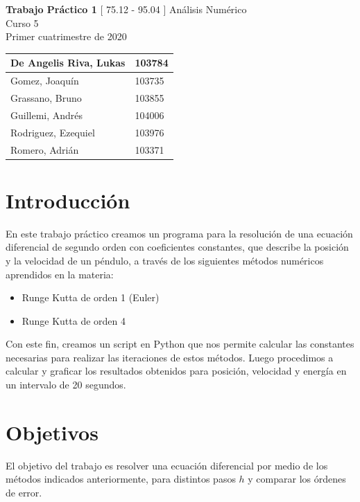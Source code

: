 \documentclass[titlepage,a4paper]{article}
\begin{document}
\begin{titlepage} %
    \centering
    \vfill
    \Huge \textbf{Trabajo Práctico 1}
    \vskip2cm
    \Large [ 75.12 - 95.04 ] Análisis Numérico\\
    Curso 5 \\ 
    Primer cuatrimestre de 2020\\
    \vfill
    \begin{tabular}{ | l | l | } 
      \hline
        De Angelis Riva, Lukas & 103784 \\ \hline
        Gomez, Joaquín & 103735 \\ \hline
        Grassano, Bruno & 103855 \\ \hline
        Guillemi, Andrés & 104006\\ \hline 
        Rodriguez, Ezequiel & 103976 \\ \hline
        Romero, Adrián & 103371 \\ \hline
  	\end{tabular}
    \vfill
    \vfill
    \vfill
\end{titlepage}

\tableofcontents %

\newpage

\section{Introducción}\label{sec:intro}
En este trabajo práctico creamos un programa para la resolución de una ecuación diferencial de segundo orden con coeficientes constantes, que describe la posición y la velocidad de un péndulo, a través de los siguientes métodos numéricos aprendidos en la materia:
\begin{itemize}
    \item Runge Kutta de orden 1 (Euler)
    \item Runge Kutta de orden 4
\end{itemize}

Con este fin, creamos un script en Python que nos permite calcular las constantes necesarias para realizar las iteraciones de estos métodos. Luego procedimos a calcular y graficar los resultados obtenidos para posición, velocidad y energía en un intervalo de 20 segundos.

\section{Objetivos}\label{sec:objetivos}
El objetivo del trabajo es resolver una ecuación diferencial por medio de los métodos indicados anteriormente, para distintos pasos $h$ y comparar los órdenes de error. 
\end{document}
